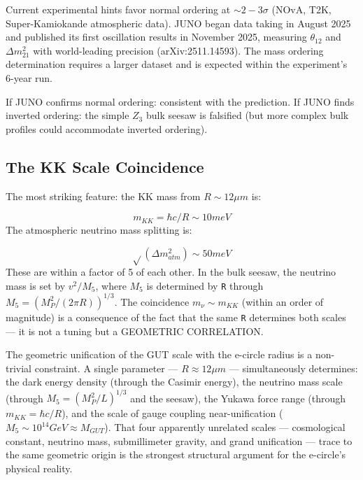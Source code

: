 \documentclass[aps,prd,preprint,superscriptaddress,longbibliography,floatfix]{revtex4-2}
\theoremstyle{remark}
\begin{document}
Current experimental hints favor normal ordering at $\sim 2-3\sigma$ (NOvA, T2K, Super-Kamiokande atmospheric data). JUNO began data taking in August 2025 and published its first oscillation results in November 2025, measuring $\theta_{12}$ and $\Delta m^{2}_{21}$ with world-leading precision (arXiv:2511.14593). The mass ordering determination requires a larger dataset and is expected within the experiment's 6-year run.

If JUNO confirms normal ordering: consistent with the prediction. If JUNO finds inverted ordering: the simple $Z_{3}$ bulk seesaw is falsified (but more complex bulk profiles could accommodate inverted ordering).


\subsection{The KK Scale Coincidence}

The most striking feature: the KK mass from $R \sim  12 \mu m$ is:


\begin{equation}
    m_{KK} = \hbar c/R \sim  10 meV
\end{equation}
The atmospheric neutrino mass splitting is:


\begin{equation}
    \sqrt{}(\Delta m^{2}_{atm}) \sim  50 meV
\end{equation}
These are within a factor of 5 of each other. In the bulk seesaw, the neutrino mass is set by $v^{2}/M_{5}$, where $M_{5}$ is determined by \texttt{R} through $M_{5} = (M_P^{2}/(2\pi R))^{1/3}$. The coincidence $m_\nu \sim  m_{KK}$ (within an order of magnitude) is a consequence of the fact that the same \texttt{R} determines both scales --- it is not a tuning but a GEOMETRIC CORRELATION.

The geometric unification of the GUT scale with the e-circle radius is a non-trivial constraint. A single parameter --- $R \approx 12 \mu m$ --- simultaneously determines: the dark energy density (through the Casimir energy), the neutrino mass scale (through $M_{5} = (M_P^{2}/L)^{1/3}$ and the seesaw), the Yukawa force range (through $m_{KK} = \hbar c/R$), and the scale of gauge coupling near-unification ($M_{5} \sim  10^{14} GeV \approx M_{GUT}$). That four apparently unrelated scales --- cosmological constant, neutrino mass, submillimeter gravity, and grand unification --- trace to the same geometric origin is the strongest structural argument for the e-circle's physical reality.
\end{document}
